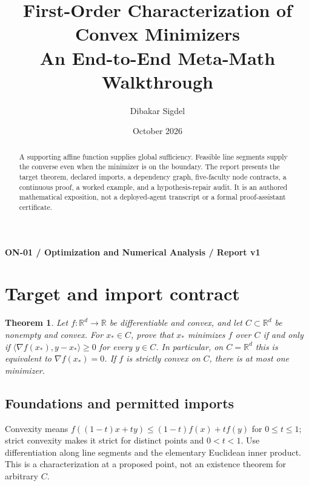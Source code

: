 \documentclass[preprint,12pt,aps,pra,showkeys,amsmath,amssymb,superscriptaddress,floatfix]{revtex4-2}
\newtheorem{theorem}{Theorem}[section]
\theoremstyle{definition}
\theoremstyle{remark}
\begin{document}
\title{First-Order Characterization of Convex Minimizers\\[4pt]\large An End-to-End Meta-Math Walkthrough}

\author{Dibakar Sigdel}


\date{October 2026}

\begin{abstract}

A supporting affine function supplies global sufficiency. Feasible line
segments supply the converse even when the minimizer is on the boundary.
The report presents the target theorem, declared imports, a dependency
graph, five-faculty node contracts, a continuous proof, a worked
example, and a hypothesis-repair audit. It is an authored mathematical
exposition, not a deployed-agent transcript or a formal proof-assistant
certificate.

\end{abstract}\maketitle\linespread{1.12}\selectfont

\noindent\textbf{ON-01 / Optimization and Numerical Analysis / Report v1}

\section{Target and import contract}

\begin{theorem}

Let \(f:\mathbb R^d\to\mathbb R\) be differentiable and convex, and let
\(C\subset\mathbb R^d\) be nonempty and convex. For \(x_*\in C\), prove
that \(x_*\) minimizes \(f\) over \(C\) if and only if
\(\langle\nabla f(x_*),y-x_*\rangle\ge0\) for every \(y\in C\). In
particular, on \(C=\mathbb R^d\) this is equivalent to
\(\nabla f(x_*)=0\). If \(f\) is strictly convex on \(C\), there is at
most one minimizer.

\end{theorem}

\subsection{Foundations and permitted imports}

Convexity means \(f((1-t)x+ty)\le(1-t)f(x)+tf(y)\) for \(0\le t\le1\);
strict convexity makes it strict for distinct points and \(0<t<1\). Use
differentiation along line segments and the elementary Euclidean inner
product. This is a characterization at a proposed point, not an
existence theorem for arbitrary \(C\).
\end{document}
